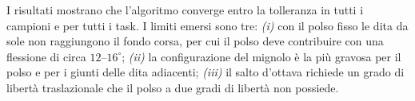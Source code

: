 I risultati mostrano che l'algoritmo converge entro la tolleranza in tutti i campioni e per tutti i task. I limiti emersi sono tre: \textit{(i)} con il polso fisso le dita da sole non raggiungono il fondo corsa, per cui il polso deve contribuire con una flessione di circa $12$--$16^\circ$; \textit{(ii)} la configurazione del mignolo \`e la pi\`u gravosa per il polso e per i giunti delle dita adiacenti; \textit{(iii)} il salto d'ottava richiede un grado di libert\`a traslazionale che il polso a due gradi di libert\`a non possiede.
